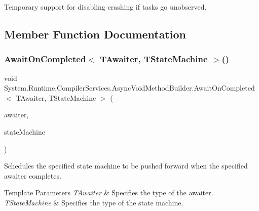 Temporary support for disabling crashing if tasks go unobserved.



\subsection{Member Function Documentation}
\mbox{\label{struct_system_1_1_runtime_1_1_compiler_services_1_1_async_void_method_builder_ab14a3a0fd8620657ecd75b0ef096aee7}} 
\subsubsection{\texorpdfstring{Await\+On\+Completed$<$ T\+Awaiter, T\+State\+Machine $>$()}{AwaitOnCompleted< TAwaiter, TStateMachine >()}}
{\footnotesize\ttfamily void System.\+Runtime.\+Compiler\+Services.\+Async\+Void\+Method\+Builder.\+Await\+On\+Completed$<$ T\+Awaiter, T\+State\+Machine $>$ (\begin{DoxyParamCaption}\item[{ref T\+Awaiter}]{awaiter,  }\item[{ref T\+State\+Machine}]{state\+Machine }\end{DoxyParamCaption})\hspace{0.3cm}{\ttfamily [inline]}}



Schedules the specified state machine to be pushed forward when the specified awaiter completes. 


\begin{DoxyTemplParams}{Template Parameters}
{\em T\+Awaiter} & Specifies the type of the awaiter.\\
\hline
{\em T\+State\+Machine} & Specifies the type of the state machine.\\
\hline
\end{DoxyTemplParams}

